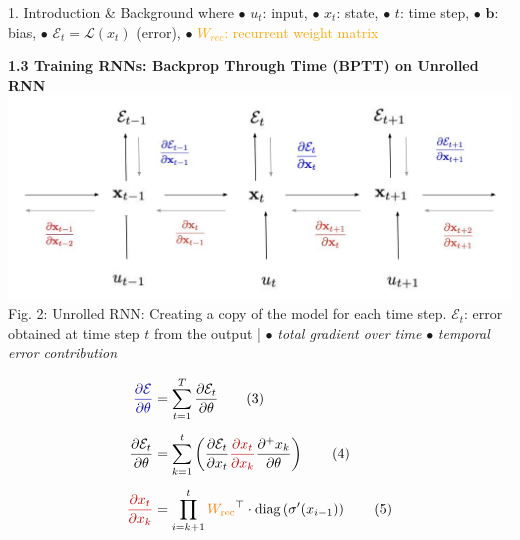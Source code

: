 \documentclass[final]{beamer}
\begin{document}
\begin{frame}[t]
\begin{columns}[t,totalwidth=\textwidth]
\begin{column}{0.3\textwidth}
\begin{block}{1. Introduction \& Background}
        \vspace{0.5em}
        where $\bullet$ $u_t$: input, $\bullet$  $x_t$: state, $\bullet$  $t$: time step, $\bullet$  $\mathbf{b}$: bias,  $\bullet$  $\mathcal{E}_t = \mathcal{L}(x_t)$ (error),  $\bullet$  \textcolor{orange}{$W_{rec}$: recurrent weight matrix}

        \vspace{0.5em}

        \textbf{1.3 Training RNNs: Backprop Through Time (BPTT) on Unrolled RNN}\\
        \includegraphics[width=0.95\linewidth]{figures/RNN.png} \\[0.3em]
         Fig. 2: Unrolled RNN: Creating a copy of the model for each time step. \textcolor{myblue}{$\mathcal{E}_t$:}  error obtained at time step $t$ from the output |
          $\bullet$ \textcolor{myblue}{ \textit{total gradient over time}}
        \quad
        $\bullet$ \textcolor{myred}{ \textit{temporal error contribution}}


        \vspace{-0.6em}
        \begin{align*}
          \textcolor{myblue}{\frac{\partial \mathcal{E}}{\partial \theta}} &=
          \sum_{t=1}^{T} \frac{\partial \mathcal{E}_t}{\partial \theta} \hspace{2em} \text{(3)} \\[0.5em]
          \frac{\partial \mathcal{E}_t}{\partial \theta} &=
          \sum_{k=1}^{t} 
          \left( {\frac{\partial \mathcal{E}_t}{\partial x_t}} 
          \textcolor{myred}{\frac{\partial x_t}{\partial x_k}}
          \frac{\partial^+ x_k}{\partial \theta} \right) \hspace{2em} \text{(4)} \\[0.5em]
          \textcolor{myred}{\frac{\partial x_t}{\partial x_k}} &=
          \prod_{i=k+1}^{t}
          \textcolor{orange}{W_{\text{rec}}}^\top \cdot \text{diag}\left(\sigma'(x_{i-1})\right) \hspace{2em} \text{(5)}
        \end{align*}
        

\end{block}
\end{column}
\end{columns}
\end{frame}
\end{document}
